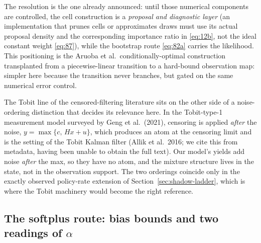 \documentclass[11pt]{article}
\begin{document}
The resolution is the one already announced: until those numerical
components are controlled, the cell construction is a \emph{proposal
and diagnostic layer} (an implementation that prunes cells or
approximates draws must use its actual proposal density and the
corresponding importance ratio in \eqref{eq:12b}, not the ideal
constant weight \eqref{eq:87}), while the bootstrap route
\eqref{eq:82a} carries the likelihood. This positioning is the Aruoba
et al.\ conditionally-optimal construction transplanted from a
piecewise-linear transition to a hard-bound observation map: simpler
here because the transition never branches, but gated on the same
numerical error control.

The Tobit line of the censored-filtering literature sits on the other
side of a noise-ordering distinction that decides its relevance here.
In the Tobit-type-1 measurement model surveyed
by Geng et al.\ (2021), censoring is applied \emph{after} the noise,
\(y=\max\{c,\,Hx+u\}\), which produces an atom at the censoring limit
and is the setting of the Tobit Kalman filter (Allik et al.\ 2016; we
cite this from metadata, having been unable to obtain the full text).
Our model's yields add noise \emph{after} the max, so they have no
atom, and the mixture structure lives in the state, not in the
observation support. The two orderings coincide only in the exactly
observed policy-rate extension of Section~\ref{sec:shadow-ladder}, which is
where the Tobit machinery would become the right reference.

\subsection{The softplus route: bias bounds and two readings of
\texorpdfstring{$\alpha$}{alpha}}
\label{sec:shadow-softplus}
\end{document}
